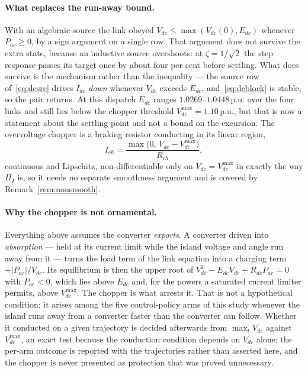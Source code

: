 \documentclass[12pt,a4paper]{article}
\theoremstyle{remark}
\newcommand{\pu}{\,\mathrm{p.u.}}
\begin{document}
\paragraph{What replaces the run-away bound.}
With an algebraic source the link obeyed
$V_{dc}\le\max(V_{dc}(0),E_{dc})$ whenever $P_{ac}\ge0$, by a sign argument on a
single row. That argument does not survive the extra state, because an inductive
source overshoots: at $\zeta=1/\sqrt2$ the step response passes its target once by
about four per cent before settling. What does survive is the mechanism rather
than the inequality --- the source row of~\eqref{eq:dcsrc} drives $I_{dc}$
\emph{down} whenever $V_{dc}$ exceeds $E_{dc}$, and~\eqref{eq:dcblock} is stable,
so the pair returns. At this dispatch $E_{dc}$ ranges $1.0269$--$1.0448\pu$ over
the four links and still lies below the chopper threshold
$V_{dc}^{\max}=1.10\pu$, but that is now a statement about the
settling point and not a bound on the excursion. The overvoltage chopper is a braking resistor
conducting in its linear region,
\begin{equation}
  I_{ch}=\frac{\max\bigl(0,\,V_{dc}-V_{dc}^{\max}\bigr)}{R_{ch}},
  \label{eq:dcchop}
\end{equation}
continuous and Lipschitz, non-differentiable only on $V_{dc}=V_{dc}^{\max}$ in
exactly the way $\Pi_I$ is, so it needs no separate smoothness argument and is
covered by Remark~\ref{rem:nonsmooth}.

\paragraph{Why the chopper is not ornamental.}
Everything above assumes the converter \emph{exports}. A converter driven into
\emph{absorption} --- held at its current limit while the island voltage and angle
run away from it --- turns the load term of the link equation into a charging term
$+|P_{ac}|/V_{dc}$. Its equilibrium is then the upper root of
$V_{dc}^{2}-E_{dc}V_{dc}+R_{dc}P_{ac}=0$ with $P_{ac}<0$, which lies above
$E_{dc}$ and, for the powers a saturated current limiter permits, above
$V_{dc}^{\max}$. The chopper is what arrests it. That is not a hypothetical
condition: it arises among the five control-policy arms of this study whenever the
island runs away from a converter faster than the converter can follow. Whether it
conducted on a given trajectory is decided afterwards from $\max_t V_{dc}$ against
$V_{dc}^{\max}$, an exact test because the conduction condition depends on
$V_{dc}$ alone; the per-arm outcome is reported with the trajectories rather than
asserted here, and the chopper is never presented as protection that was proved
unnecessary.
\end{document}
